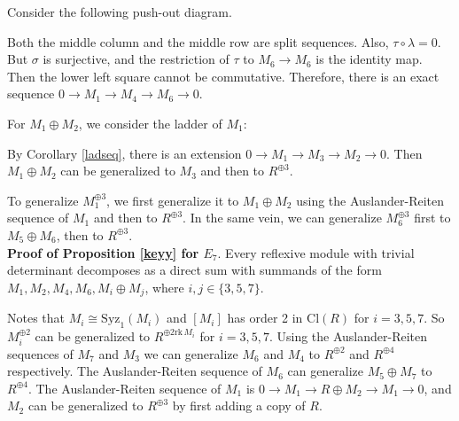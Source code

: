 \documentclass{amsart}[12pt]
\theoremstyle{definition}
\theoremstyle{remark}
\numberwithin{equation}{section}
\begin{document}
Consider the following push-out diagram.
\begin{center}
 \end{center} 
 
Both the middle column and the middle row are split sequences. Also, $\tau \circ \lambda = 0$. But $\sigma$ is surjective, and the restriction of $\tau$ to $M_6 \to M_6$ is the identity map. Then the lower left square cannot be commutative. Therefore, there is an exact sequence $0 \to M_1 \to M_4 \to M_6 \to 0$. 

For $M_1 \oplus M_2$, we consider the ladder of $M_1$:
\begin{center}
 \end{center} 
By Corollary \ref{ladseq}, there is an extension $0 \to M_1 \to M_3 \to M_2 \to 0$. Then $M_1 \oplus M_2$ can be generalized to $M_3$ and then to $R^{\oplus 3}$.

To generalize $M_1^{\oplus 3}$, we first generalize it to $M_1 \oplus M_2$ using the Auslander-Reiten sequence of $M_1$ and then to $R^{\oplus 3}$. In the same vein, we can generalize $M_6^{\oplus 3}$ first to $M_5 \oplus M_6$, then to $R^{\oplus 3}$.
\\

\noindent \textbf{Proof of Proposition \ref{keyy} for $E_7$}.
Every reflexive module with trivial determinant decomposes as a direct sum with summands of the form $M_1, M_2, M_4, M_6, M_i \oplus M_j$, where $i, j \in \{3, 5, 7\}$. 

Notes that $M_i \cong \mathrm{Syz}_1(M_i)$ and $[M_i]$ has order 2 in $\mathrm{Cl}(R)$ for $i = 3, 5, 7$. So $M_i^{\oplus 2}$ can be generalized to $R^{\oplus 2 \mathrm{rk} \, M_i}$ for $i = 3, 5, 7$. Using the Auslander-Reiten sequences of $M_7$ and $M_3$ we can generalize $M_6$ and $M_4$ to $R^{\oplus 2}$ and $R^{\oplus 4}$ respectively. The Auslander-Reiten sequence of $M_6$ can generalize $M_5 \oplus M_7$ to $R^{\oplus 4}$. The Auslander-Reiten sequence of $M_1$ is $0 \to M_1 \to R \oplus M_2 \to M_1 \to 0$, and $M_2$ can be generalized to $R^{\oplus 3}$ by first adding a copy of $R$. 
\end{document}

